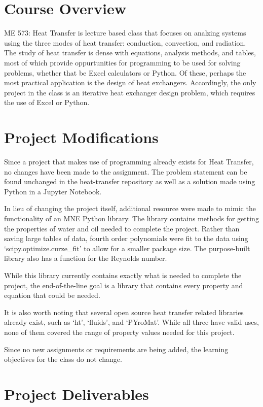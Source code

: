 \section{Course Overview}

ME 573: Heat Transfer is lecture based class that focuses on analzing systems using
the three modes of heat transfer: conduction, convection, and radiation. The study of
heat transfer is dense with equations, analysis methods, and tables, most of which
provide oppurtunities for programming to be used for solving problems, whether that
be Excel calculators or Python. Of these, perhaps the most practical application 
is the design of heat exchangers. Accordingly, the only project in the class is an 
iterative heat exchanger design problem, which requires the use of Excel or Python.

\section{Project Modifications}

Since a project that makes use of programming already exists for Heat Transfer, no
changes have been made to the assignment. The problem statement can be found unchanged
in the heat-transfer repository as well as a solution made using Python in a Jupyter
Notebook.

In lieu of changing the project itself, additional resource were made to mimic the 
functionality of an MNE Python library. The library contains methods for getting 
the properties of water and oil needed to complete the project. Rather than saving
large tables of data, fourth order polynomials were fit to the data using 
`scipy.optimize.curze\_fit' to allow for a smaller package size. The purpose-built
library also has a function for the Reynolds number. 

While this library currently contains exactly what is needed to complete the project,
the end-of-the-line goal is a library that contains every property and equation that
could be needed.

It is also worth noting that several open source heat transfer related libraries 
already exist, such as `ht', `fluids', and `PYroMat'. While all three have valid
uses, none of them covered the range of property values needed for this project.

Since no new assignments or requirements are being added, the learning objectives
for the class do not change. 

\section{Project Deliverables}

